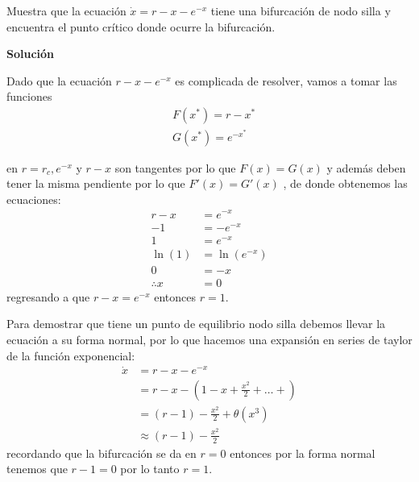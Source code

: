 \begin{ejemplo} Muestra que la ecuación $\dot{x}=r-x-e^{-x}$ tiene una bifurcación de nodo silla y encuentra el punto crítico donde ocurre la bifurcación.
\vspace{2mm}

  \textbf{Solución}

  Dado que la ecuación $r-x-e^{-x}$ es complicada de resolver, vamos a tomar las funciones
  \begin{align*}
    &F(x^*) = r-x^* \\
    &G(x^*)=e^{-x^*} 
  \end{align*}

  \begin{figure}[H]
   \centering
  \end{figure} 

  en $r=r_c, e^{-x}$ y $r-x$ son tangentes por lo que $F(x)=G(x)$ y además deben tener la misma pendiente por lo que  $F'(x)=G'(x)$ , de donde obtenemos las ecuaciones:
  \begin{align*}
    r-x &= e^{-x} \\
    -1 &= -e^{-x} \\
    1 &= e^{-x} \\
    \ln(1) &= \ln(e^{-x}) \\
    0 &= -x \\
    \therefore x&=0 
  \end{align*}
  regresando a que $r-x=e^{-x}$ entonces $r=1$.

  Para demostrar que tiene un punto de equilibrio nodo silla debemos llevar la ecuación a su forma normal, por lo que hacemos una expansión en series de taylor de la función exponencial:
  $$
\begin{aligned}
\dot{x} &=r-x-e^{-x} \\
&=r-x-\left(1-x+\frac{x^{2}}{2}+\ldots+\right) \\
&=(r-1)-\frac{x^{2}}{2}+\theta\left(x^{3}\right) \\
& \approx(r-1)-\frac{x^{2}}{2}
\end{aligned}  
  $$
  recordando que la bifurcación se da en $r=0$ entonces por la forma normal tenemos que $r-1=0$ por lo tanto $r=1$.
\end{ejemplo}

  
